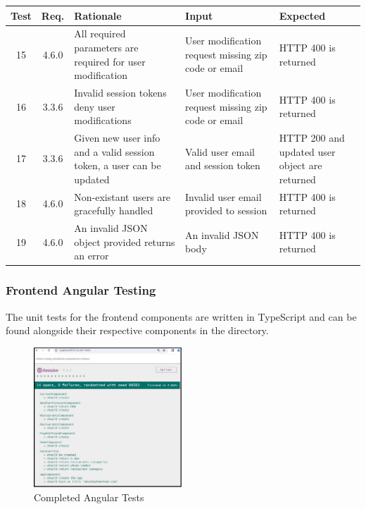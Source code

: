\documentclass[12pt]{article}
\begin{document}
\setlength{\tabcolsep}{3mm}
\begin{tabular}{|c|c|p{5cm}|p{3cm}|p{3cm}|}
    \hline
    Test & Req.  & Rationale                                                            & Input                                               & Expected                                      \\

    \hline
    15   & 4.6.0 & All required parameters are required for user modification           & User modification request missing zip code or email & HTTP 400 is returned                          \\
    \hline
    16   & 3.3.6 & Invalid session tokens deny user modifications                       & User modification request missing zip code or email & HTTP 400 is returned                          \\
    \hline
    17   & 3.3.6 & Given new user info and a valid session token, a user can be updated & Valid user email and session token                  & HTTP 200 and updated user object are returned \\
    \hline
    18   & 4.6.0 & Non-existant users are gracefully handled                            & Invalid user email provided to session              & HTTP 400 is returned                          \\
    \hline
    19   & 4.6.0 & An invalid JSON object provided returns an error                     & An invalid JSON body                                & HTTP 400 is returned                          \\
    \hline
\end{tabular}

\subsubsection{Frontend Angular Testing}

The unit tests for the frontend components are written in TypeScript and can be found alongside their respective components in the \href{https://github.com/AboutMyHT/angular-app/tree/main/src}{} directory.

\begin{figure}[htbp]
    \centering
    \includegraphics[width=0.5\textwidth]{images/completed_angular_tests.jpg}
    \caption{Completed Angular Tests}
    \label{fig:angular-tests}
\end{figure}
\end{document}
